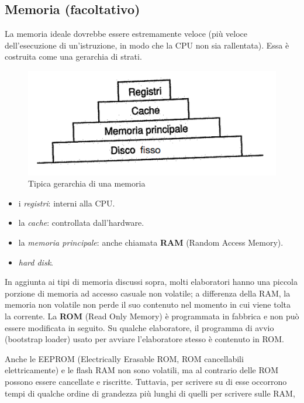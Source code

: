 \subsection{Memoria (facoltativo)}
La memoria ideale dovrebbe essere estremamente veloce (più veloce dell'esecuzione di un'istruzione, in modo che la CPU non sia rallentata).
Essa è costruita come una gerarchia di strati.

\begin{figure}
\includegraphics[width=1\linewidth]{assets/memoria1.png} 
\caption{Tipica gerarchia di una memoria}
\end{figure}

\phantom{ }
\begin{itemize}
    \item i \textit{registri}: interni alla CPU.
    \item la \textit{cache}: controllata dall'hardware.
    \item la \textit{memoria principale}: anche chiamata \textbf{RAM} (Random Access Memory).
    \item \textit{hard disk}.
\end{itemize}

In aggiunta ai tipi di memoria discussi sopra, molti elaboratori hanno una piccola porzione di memoria ad accesso casuale non volatile; a differenza della RAM, la memoria non volatile non perde il suo contenuto nel momento in cui viene tolta la corrente. La \textbf{ROM} (Read Only Memory) è programmata in fabbrica e non può essere modificata in seguito. Su qualche elaboratore, il programma di avvio (bootstrap loader) usato per avviare l'elaboratore stesso è contenuto in ROM.

Anche le EEPROM (Electrically Erasable ROM, ROM cancellabili elettricamente) e le flash RAM non sono volatili, ma al contrario delle ROM possono essere cancellate e riscritte. Tuttavia, per scrivere su di esse occorrono tempi di qualche ordine di grandezza più lunghi di quelli per scrivere sulle RAM,


